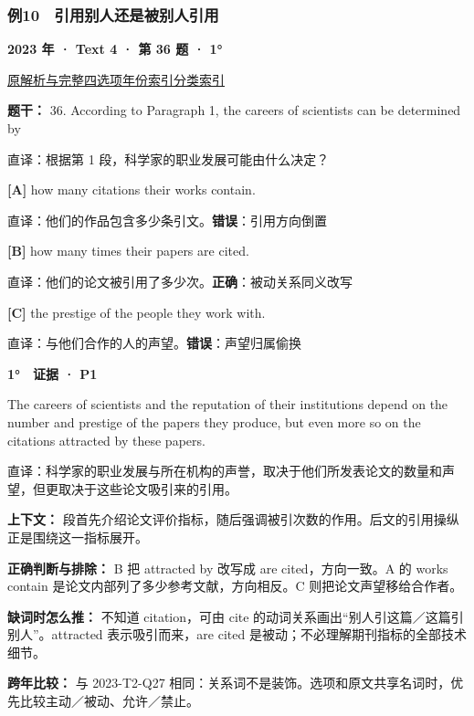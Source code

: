 \documentclass[11pt,a4paper]{article}
\begin{document}
\subsubsection{例10　引用别人还是被别人引用}\label{case-2023-T4-Q36}
\noindent\textbf{2023 年 · Text 4 · 第 36 题 · 1°}\par\noindent \href{https://zj139.github.io/math-notes/english/992b4ff31df156ca5bf5dfbd/\#q36}{原解析与完整四选项}\quad \hyperref[idx-2023-T4-Q36]{年份索引}\quad \hyperref[class-R05]{分类索引}\par\smallskip
\noindent\textbf{题干：} 36. According to Paragraph 1, the careers of scientists can be determined by\par\smallskip
直译：根据第 1 段，科学家的职业发展可能由什么决定？

\noindent\textbf{[A]} how many citations their works contain.\par\nopagebreak
\noindent 直译：他们的作品包含多少条引文。\quad\textbf{错误}：引用方向倒置\par\smallskip
{}\noindent\textbf{[B]} how many times their papers are cited.\par\nopagebreak
\noindent 直译：他们的论文被引用了多少次。\quad\textbf{正确}：被动关系同义改写\par\smallskip
{}\noindent\textbf{[C]} the prestige of the people they work with.\par\nopagebreak
\noindent 直译：与他们合作的人的声望。\quad\textbf{错误}：声望归属偷换\par\smallskip
\begin{evidence}\textbf{1°　证据 · P1}\par The careers of scientists and the reputation of their institutions depend on the number and prestige of the papers they produce, but even more so on the citations attracted by these papers.\par 直译：科学家的职业发展与所在机构的声誉，取决于他们所发表论文的数量和声望，但更取决于这些论文吸引来的引用。\end{evidence}
\noindent\textbf{上下文：} 段首先介绍论文评价指标，随后强调被引次数的作用。后文的引用操纵正是围绕这一指标展开。\par\smallskip
\noindent\textbf{正确判断与排除：} B 把 attracted by 改写成 are cited，方向一致。A 的 works contain 是论文内部列了多少参考文献，方向相反。C 则把论文声望移给合作者。\par\smallskip
\noindent\textbf{缺词时怎么推：} 不知道 citation，可由 cite 的动词关系画出“别人引这篇／这篇引别人”。attracted 表示吸引而来，are cited 是被动；不必理解期刊指标的全部技术细节。\par\smallskip
\noindent\textbf{跨年比较：} 与 2023-T2-Q27 相同：关系词不是装饰。选项和原文共享名词时，优先比较主动／被动、允许／禁止。\par\smallskip
\clearpage
\end{document}
